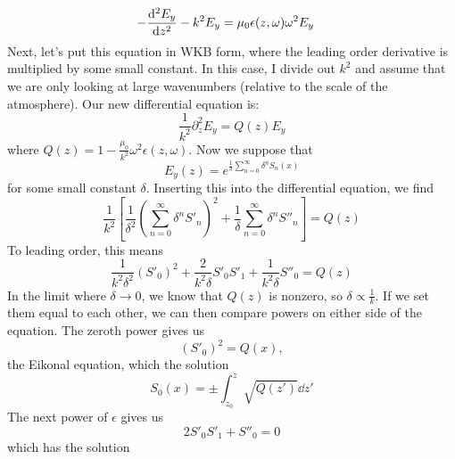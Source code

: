 \documentclass[a4paper,twoside]{article}
\begin{document}
\begin{itemize}
\begin{problem}
\begin{align}
                - \dv[2]{E_y}{z} - k^2 E_y &= \mu_0 \epsilon(z, \omega) \omega^2 E_y
            \end{align}
            Next, let's put this equation in WKB form, where the leading order derivative is multiplied by some small constant. In this case, I divide out $ k^2 $ and assume that we are only looking at large wavenumbers (relative to the scale of the atmosphere). Our new differential equation is:
            \begin{equation}
                \frac{1}{k^2} \partial_z^2 E_y = Q(z) E_y
            \end{equation}
            where $ Q(z) = 1 - \frac{\mu_0}{k^2} \omega^2 \epsilon(z, \omega) $. Now we suppose that
            \begin{equation}
                E_y(z) = e^{\frac{1}{\delta} \sum_{n=0}^{\infty} \delta^n S_n(x)}
            \end{equation}
            for some small constant $ \delta $. Inserting this into the differential equation, we find
            \begin{equation}
                \frac{1}{k^2} \left[ \frac{1}{\delta^2} \left( \sum_{n=0}^{\infty} \delta^n S'_n \right)^2 + \frac{1}{\delta} \sum_{n=0}^{\infty} \delta^n S''_n \right] = Q(z)
            \end{equation}
            To leading order, this means
            \begin{equation}
                \frac{1}{k^2 \delta^2} (S'_0)^2 + \frac{2}{k^2 \delta} S'_0 S'_1 + \frac{1}{k^2 \delta} S''_0 = Q(z)
            \end{equation}
            In the limit where $ \delta \to 0 $, we know that $ Q(z) $ is nonzero, so $ \delta \propto \frac{1}{k} $. If we set them equal to each other, we can then compare powers on either side of the equation. The zeroth power gives us
            \begin{equation}
                (S'_0)^2 = Q(x),
            \end{equation}
            the Eikonal equation, which the solution
            \begin{equation}
                S_0(x) = \pm \int_{z_0}^{z} \sqrt{Q(z')} \dd{z'}
            \end{equation}
            The next power of $ \epsilon $ gives us
            \begin{equation}
                2 S'_0 S'_1 + S''_0 = 0
            \end{equation}
            which has the solution
            \begin{equation}

\end{equation}
\end{problem}
\end{itemize}
\end{document}
